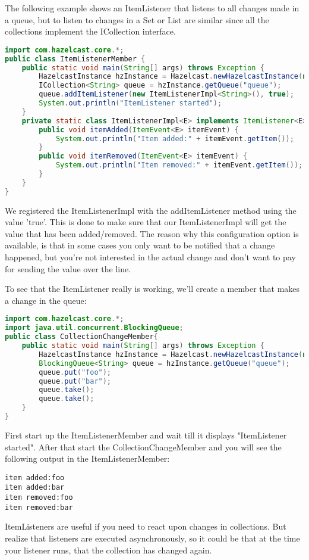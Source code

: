 The following example shows an ItemListener that listens to all changes made in a queue, but to listen to changes in a Set or List are similar since all the collections implement the ICollection interface.
\begin{lstlisting}[language=java]
import com.hazelcast.core.*;
public class ItemListenerMember {
    public static void main(String[] args) throws Exception {
        HazelcastInstance hzInstance = Hazelcast.newHazelcastInstance(null);
        ICollection<String> queue = hzInstance.getQueue("queue");
        queue.addItemListener(new ItemListenerImpl<String>(), true);
        System.out.println("ItemListener started");
    }
    private static class ItemListenerImpl<E> implements ItemListener<E> {
        public void itemAdded(ItemEvent<E> itemEvent) {
            System.out.println("Item added:" + itemEvent.getItem());
        }
        public void itemRemoved(ItemEvent<E> itemEvent) {
            System.out.println("Item removed:" + itemEvent.getItem());
        }
    }
}
\end{lstlisting}
We registered the ItemListenerImpl with the addItemListener method using the value 'true'. This is done to make sure that our ItemListenerImpl will get the value that has been added/removed. The reason why this configuration option is available, is that in some cases you only want to be notified that a change happened, but you're not interested in the actual change and don't want to pay for sending the value over the line.

To see that the ItemListener really is working, we'll create a member that makes a change in the queue:
\begin{lstlisting}[language=java]
import com.hazelcast.core.*;
import java.util.concurrent.BlockingQueue;
public class CollectionChangeMember{
    public static void main(String[] args) throws Exception {
        HazelcastInstance hzInstance = Hazelcast.newHazelcastInstance(null);
        BlockingQueue<String> queue = hzInstance.getQueue("queue");
        queue.put("foo");
        queue.put("bar");
        queue.take();
        queue.take();
    }
}
\end{lstlisting}
First start up the ItemListenerMember and wait till it displays "ItemListener started". After that start the CollectionChangeMember and you will see the following output in the ItemListenerMember:
\begin{lstlisting}
item added:foo
item added:bar
item removed:foo
item removed:bar
\end{lstlisting}
ItemListeners are useful if you need to react upon changes in collections. But realize that listeners are executed asynchronously, so it could be that at the time your listener runs, that the collection has changed again. 


